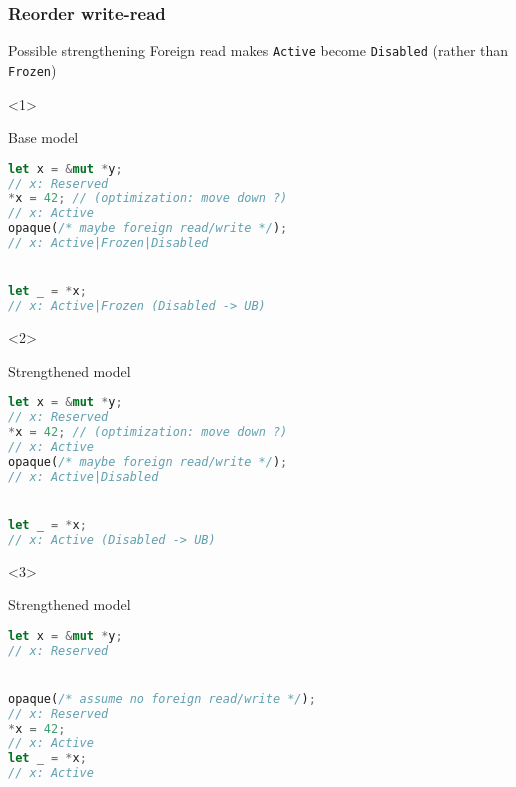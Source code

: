 \begin{frame}[fragile, t]
    \frametitle{Reorder write-read}
    \begin{exampleblock}{Possible strengthening}
        Foreign read makes \texttt{Active} become \texttt{Disabled}
        (rather than \texttt{Frozen})
    \end{exampleblock}


    \begin{onlyenv}<1>
        \begin{block}{{\xmark} Base model}
            \begin{lstlisting}[language=rust, basicstyle=\ttfamily\scriptsize]
let x = &mut *y;
// x: Reserved
*x = 42; // (optimization: move down ?)
// x: Active
opaque(/* maybe foreign read/write */);
// x: Active|Frozen|Disabled


let _ = *x;
// x: Active|Frozen (Disabled -> UB)
            \end{lstlisting}
        \end{block}
    \end{onlyenv}

    \begin{onlyenv}<2>
        \begin{block}{{\cmark} Strengthened model}
            \begin{lstlisting}[language=rust, basicstyle=\ttfamily\scriptsize]
let x = &mut *y;
// x: Reserved
*x = 42; // (optimization: move down ?)
// x: Active
opaque(/* maybe foreign read/write */);
// x: Active|Disabled


let _ = *x;
// x: Active (Disabled -> UB)
            \end{lstlisting}
        \end{block}
    \end{onlyenv}

    \begin{onlyenv}<3>
        \begin{block}{{\cmark} Strengthened model}
            \begin{lstlisting}[language=rust, basicstyle=\ttfamily\scriptsize]
let x = &mut *y;
// x: Reserved


opaque(/* assume no foreign read/write */);
// x: Reserved
*x = 42;
// x: Active
let _ = *x;
// x: Active
            \end{lstlisting}
        \end{block}
    \end{onlyenv}



\end{frame}

